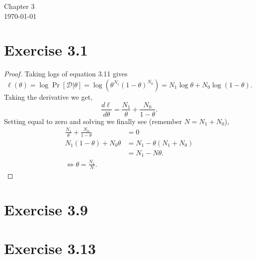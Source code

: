 \documentclass[12pt]{article}
\newcommand{\D}{\mathcal{D}}
\begin{document}
\begin{center}
{\Large Chapter 3}\\
\today
\end{center}
\section*{Exercise 3.1}
\begin{proof}
Taking logs of equation 3.11 gives
\[\ell(\theta) = \log \Pr[\D|\theta] = \log\left(\theta^{N_1}(1 - \theta)^{N_0} \right) = N_1 \log \theta + N_0 \log (1 - \theta).\] 
Taking the derivative we get,
\[\frac{d \ell}{d \theta} = \frac{N_1}{\theta} + \frac{N_0}{1 - \theta}.\]
Setting equal to zero and solving we finally see (remember $N = N_1 + N_0$),
\begin{align*}
    \frac{N_1}{\theta} + \frac{N_0}{1 - \theta} &= 0\\
    N_1 (1 - \theta) + N_0 \theta &= N_1 - \theta(N_1 + N_0)\\
    &= N_1 - N\theta.\\
    \iff \theta = \frac{N_1}{N}.
\end{align*}
\end{proof}
\section*{Exercise 3.9}
\section*{Exercise 3.13}
\end{document}
